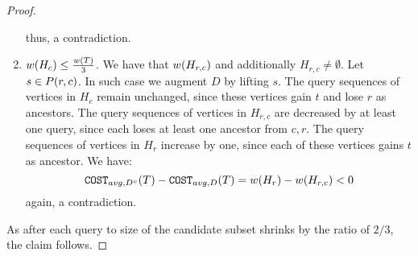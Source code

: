 \begin{theorem}
\begin{proof}
\begin{enumerate}
$$$$
thus, a contradiction.
\item $w\mathopen{}\left( H_c \right)\leq \frac{w\mathopen{}\left( T \right)}{3}$. We have that $w\mathopen{}\left( H_{r, c} \right)$ and additionally $H_{r, c}\neq\emptyset$. Let $s\in P\mathopen{}\left( r, c \right)$. In such case we augment $D$ by lifting $s$. The query sequences of vertices in
$H_{c}$ remain  unchanged, since these vertices gain $t$ and lose $r$ as ancestors. The query sequences of vertices in $H_{r,c}$ are
decreased by at least one query, since each loses at least one ancestor from ${c, r}$. The query sequences of
vertices in $H_r$ increase by one, since each of these vertices gains $t$ as ancestor. We have:
$$
\texttt{COST}_{avg, D^v}\mathopen{}\left( T \right)-\texttt{COST}_{avg, D}\mathopen{}\left( T \right)=w\mathopen{}\left( H_r \right)-w\mathopen{}\left( H_{r,c} \right)< 0
$$
again, a contradiction.
        \end{enumerate}
As after each query to size of the candidate subset shrinks by the ratio of $2/3$, the claim follows.
    \end{proof}
\end{theorem}

